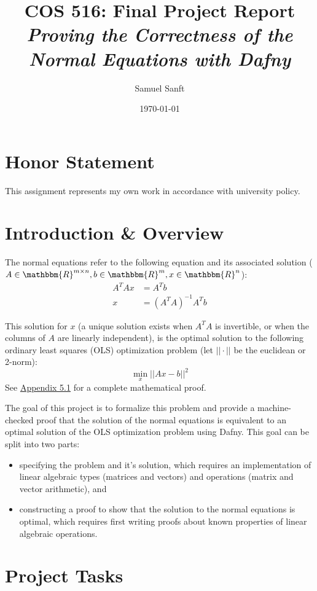 \documentclass[12pt]{article}
\begin{document}
\title{COS 516: Final Project Report\\
\emph{Proving the Correctness of the Normal Equations with Dafny}} %
\author{Samuel Sanft}
\date{\today}
\maketitle

\section*{Honor Statement}
This assignment represents my own work in accordance with university policy.

\section{Introduction \& Overview}
The normal equations refer to the following equation and its associated solution ($A \in \mathbbm{R}^{m \times n}, b \in \mathbbm{R}^m, x \in \mathbbm{R}^n$):
\begin{align*}
A^T A x &= A^T b \\
x &= (A^T A)^{-1} A^T b
\end{align*}

This solution for $x$ (a unique solution exists when $A^T A$ is invertible, or when the columns of $A$ are linearly independent), is the optimal solution to the following ordinary least squares (OLS) optimization problem (let $||\cdot||$ be the euclidean or 2-norm):
$$\min_x ||Ax - b||^2$$
See \hyperref[sec:mathproof]{Appendix 5.1} for a complete mathematical proof.

The goal of this project is to formalize this problem and provide a machine-checked proof that the solution of the normal equations is equivalent to an optimal solution of the OLS optimization problem using Dafny. This goal can be split into two parts:
\begin{itemize}
\item specifying the problem and it's solution, which requires an implementation of linear algebraic types (matrices and vectors) and operations (matrix and vector arithmetic), and
\item constructing a proof to show that the solution to the normal equations is optimal, which requires first writing proofs about known properties of linear algebraic operations.
\end{itemize}

\section{Project Tasks}
\end{document}
